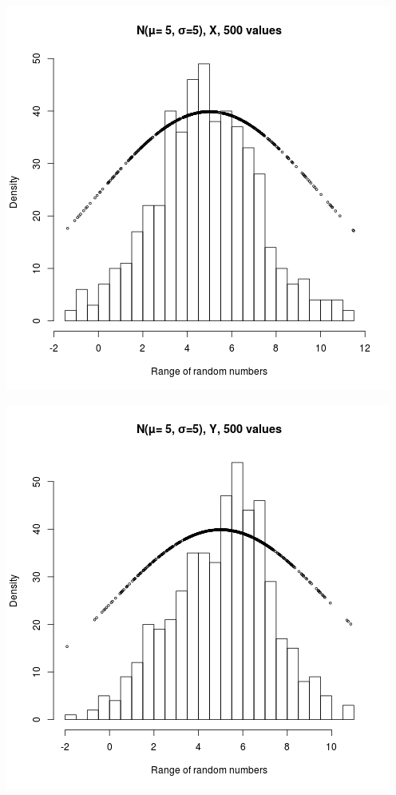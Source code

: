 \documentclass{article}
\begin{document}
\includegraphics{"plot3_2_X"}
\pagebreak

\includegraphics{"plot3_2_Y"}
\pagebreak
\end{document}
